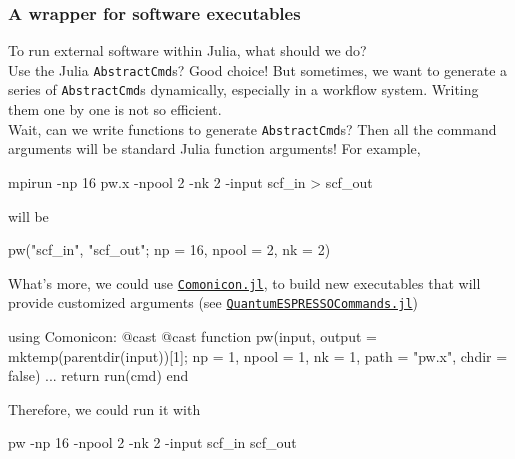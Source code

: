 \subsubsection{A wrapper for \ab{} software executables}

\begin{frame}{\subsubsecname}
    To run external \ab{} software within Julia, what should we do?\\

    Use the Julia \texttt{AbstractCmd}s? Good choice!
    But sometimes, we want to generate a series of \texttt{AbstractCmd}s dynamically,
    especially in a workflow system.
    Writing them one by one is not so efficient.\\

    Wait, can we write functions to generate \texttt{AbstractCmd}s? Then all the command
    arguments will be standard Julia function arguments! For example,

    {\scriptsize
            \begin{algorithmblock}
                \begin{juliaverbatim}
mpirun -np 16 pw.x -npool 2 -nk 2 -input scf_in > scf_out
                \end{juliaverbatim}
            \end{algorithmblock}
        }

    will be

        {\scriptsize
            \begin{algorithmblock}
                \begin{juliaverbatim}
pw("scf_in", "scf_out"; np = 16, npool = 2, nk = 2)
                \end{juliaverbatim}
            \end{algorithmblock}
        }

    \framebreak

    What's more, we could use
    \href{https://github.com/comonicon/Comonicon.jl}{\texttt{Comonicon.jl}},
    to build new executables that will provide customized arguments
    (see \href{https://github.com/MineralsCloud/QuantumESPRESSOCommands.jl}{\texttt{QuantumESPRESSOCommands.jl}})

    {\scriptsize
            \begin{algorithmblock}
                \begin{juliaverbatim}
using Comonicon: @cast
@cast function pw(input, output = mktemp(parentdir(input))[1];
                  np = 1, npool = 1, nk = 1, path = "pw.x", chdir = false)
    ...
    return run(cmd)
end
                \end{juliaverbatim}
            \end{algorithmblock}
        }

    Therefore, we could run it with

        {\scriptsize
            \begin{algorithmblock}
                \begin{juliaverbatim}
pw -np 16 -npool 2 -nk 2 -input scf_in scf_out
            \end{juliaverbatim}
            \end{algorithmblock}
        }

\end{frame}
